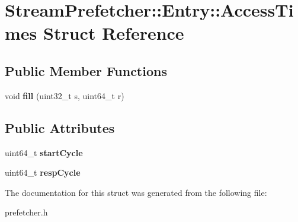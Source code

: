 \hypertarget{structStreamPrefetcher_1_1Entry_1_1AccessTimes}{\section{Stream\-Prefetcher\-:\-:Entry\-:\-:Access\-Times Struct Reference}
\label{structStreamPrefetcher_1_1Entry_1_1AccessTimes}
}
\subsection*{Public Member Functions}
\begin{DoxyCompactItemize}
\item 
\hypertarget{structStreamPrefetcher_1_1Entry_1_1AccessTimes_ab2d299ef0de5674ed3f10e1e33f11ba6}{void {\bfseries fill} (uint32\-\_\-t s, uint64\-\_\-t r)}\label{structStreamPrefetcher_1_1Entry_1_1AccessTimes_ab2d299ef0de5674ed3f10e1e33f11ba6}

\end{DoxyCompactItemize}
\subsection*{Public Attributes}
\begin{DoxyCompactItemize}
\item 
\hypertarget{structStreamPrefetcher_1_1Entry_1_1AccessTimes_a5d53e5883288b72f7958aaa4bf36b1be}{uint64\-\_\-t {\bfseries start\-Cycle}}\label{structStreamPrefetcher_1_1Entry_1_1AccessTimes_a5d53e5883288b72f7958aaa4bf36b1be}

\item 
\hypertarget{structStreamPrefetcher_1_1Entry_1_1AccessTimes_a5af85d4482dfd85f6804a1d290d43ab7}{uint64\-\_\-t {\bfseries resp\-Cycle}}\label{structStreamPrefetcher_1_1Entry_1_1AccessTimes_a5af85d4482dfd85f6804a1d290d43ab7}

\end{DoxyCompactItemize}


The documentation for this struct was generated from the following file\-:\begin{DoxyCompactItemize}
\item 
prefetcher.\-h\end{DoxyCompactItemize}
